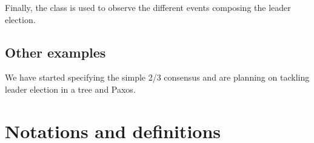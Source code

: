 \documentclass[final]{article}
\begin{document}
Finally, the class  is used to observe the
different events composing the leader election.


\subsection{Other examples}


We have started specifying the simple 2/3 consensus and are planning
on tackling leader election in a tree and Paxos.








\section{Notations and definitions}
\end{document}
